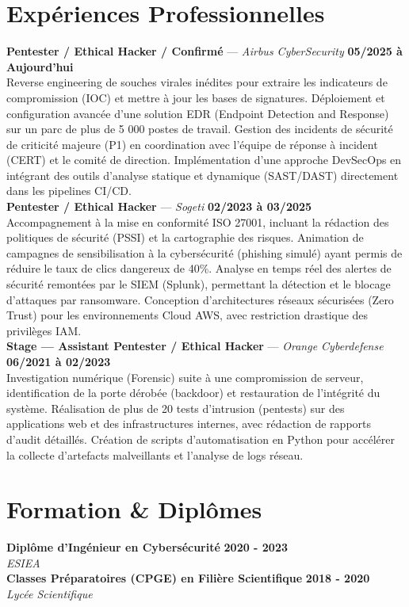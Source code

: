 \documentclass[11pt,a4paper]{article}
\begin{document}
\section*{Expériences Professionnelles}
\noindent \textbf{Pentester / Ethical Hacker / Confirmé} --- \textit{Airbus CyberSecurity} \hfill \textbf{05/2025 à Aujourd'hui} \\
Reverse engineering de souches virales inédites pour extraire les indicateurs de compromission (IOC) et mettre à jour les bases de signatures. Déploiement et configuration avancée d'une solution EDR (Endpoint Detection and Response) sur un parc de plus de 5 000 postes de travail. Gestion des incidents de sécurité de criticité majeure (P1) en coordination avec l'équipe de réponse à incident (CERT) et le comité de direction. Implémentation d'une approche DevSecOps en intégrant des outils d'analyse statique et dynamique (SAST/DAST) directement dans les pipelines CI/CD. \\[0.3cm]
\noindent \textbf{Pentester / Ethical Hacker} --- \textit{Sogeti} \hfill \textbf{02/2023 à 03/2025} \\
Accompagnement à la mise en conformité ISO 27001, incluant la rédaction des politiques de sécurité (PSSI) et la cartographie des risques. Animation de campagnes de sensibilisation à la cybersécurité (phishing simulé) ayant permis de réduire le taux de clics dangereux de 40\%. Analyse en temps réel des alertes de sécurité remontées par le SIEM (Splunk), permettant la détection et le blocage d'attaques par ransomware. Conception d'architectures réseaux sécurisées (Zero Trust) pour les environnements Cloud AWS, avec restriction drastique des privilèges IAM. \\[0.3cm]
\noindent \textbf{Stage — Assistant Pentester / Ethical Hacker} --- \textit{Orange Cyberdefense} \hfill \textbf{06/2021 à 02/2023} \\
Investigation numérique (Forensic) suite à une compromission de serveur, identification de la porte dérobée (backdoor) et restauration de l'intégrité du système. Réalisation de plus de 20 tests d'intrusion (pentests) sur des applications web et des infrastructures internes, avec rédaction de rapports d'audit détaillés. Création de scripts d'automatisation en Python pour accélérer la collecte d'artefacts malveillants et l'analyse de logs réseau. \\[0.3cm]


\vspace{0.3cm}

\section*{Formation \& Diplômes}
\noindent \textbf{Diplôme d'Ingénieur en Cybersécurité} \hfill \textbf{2020 - 2023} \\
\textit{ESIEA} \\[0.3cm]
\noindent \textbf{Classes Préparatoires (CPGE) en Filière Scientifique} \hfill \textbf{2018 - 2020} \\
\textit{Lycée Scientifique} \\[0.3cm]
\end{document}
